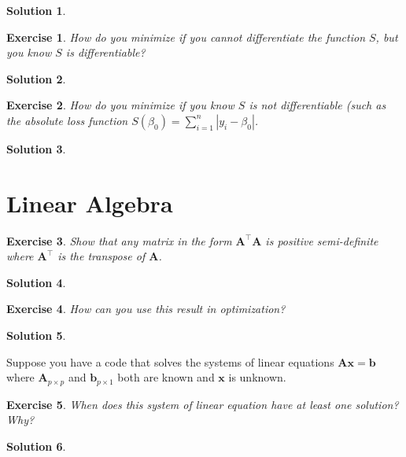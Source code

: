 \documentclass[12pt,a4paper]{article}
\def\T{^\top} %
\newtheorem{exercise}{Exercise}
\numberwithin{exercise}{section} %
\newtheorem{solution}{Solution}
\numberwithin{solution}{section} %
\begin{document}
\begin{solution}
\end{solution}


\begin{exercise}
 How do you minimize if you cannot differentiate the function $S$, but you know $S$ is differentiable?
\end{exercise}

\begin{solution}
\end{solution}



\begin{exercise}
 How do you minimize if you know $S$ is not differentiable (such as the absolute loss function $S(\beta_0)=\sum_{i=1}^n |y_i -\beta_0 |$.
\end{exercise}

\begin{solution}
\end{solution}




\section{Linear Algebra}
\begin{exercise}
 Show that any matrix in the form $\mathbf A\T\mathbf A$ is positive semi-definite where $\mathbf A\T$ is the transpose of $\mathbf A$. 
 \end{exercise}

\begin{solution}
\end{solution}


 \begin{exercise}
How can you use this result in optimization? 
\end{exercise}

\begin{solution}
\end{solution}


Suppose you have a code that solves the systems of linear equations $\mathbf A \mathbf x =\mathbf b$ where $\mathbf A_{p\times p}$ and $\mathbf b_{p\times 1}$ both are known and $\mathbf x$ is unknown. 
\begin{exercise}
When does this system of linear equation have at least one solution? Why?
\end{exercise} 

\begin{solution}
\end{solution}
\end{document}

